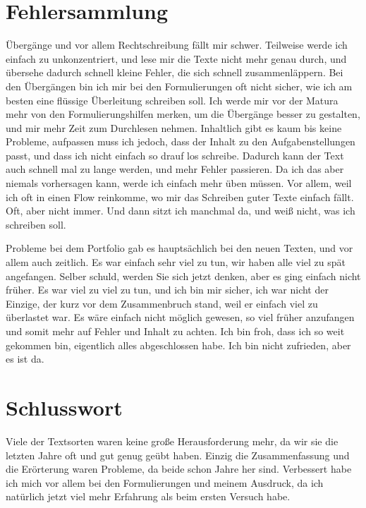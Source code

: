 \section{Fehlersammlung}

Übergänge und vor allem Rechtschreibung fällt mir schwer. Teilweise werde ich einfach zu unkonzentriert, und lese mir die Texte nicht mehr genau durch, und übersehe dadurch schnell kleine Fehler, die sich schnell zusammenläppern. Bei den Übergängen bin ich mir bei den Formulierungen oft nicht sicher, wie ich am besten eine flüssige Überleitung schreiben soll. Ich werde mir vor der Matura mehr von den Formulierungshilfen merken, um die Übergänge besser zu gestalten, und mir mehr Zeit zum Durchlesen nehmen. Inhaltlich gibt es kaum bis keine Probleme, aufpassen muss ich jedoch, dass der Inhalt zu den Aufgabenstellungen passt, und dass ich nicht einfach so drauf los schreibe. Dadurch kann der Text auch schnell mal zu lange werden, und mehr Fehler passieren. Da ich das aber niemals vorhersagen kann, werde ich einfach mehr üben müssen. Vor allem, weil ich oft in einen Flow reinkomme, wo mir das Schreiben guter Texte einfach fällt. Oft, aber nicht immer. Und dann sitzt ich manchmal da, und weiß nicht, was ich schreiben soll. 

Probleme bei dem Portfolio gab es hauptsächlich bei den neuen Texten, und vor allem auch zeitlich. Es war einfach sehr viel zu tun, wir haben alle viel zu spät angefangen. Selber schuld, werden Sie sich jetzt denken, aber es ging einfach nicht früher. Es war viel zu viel zu tun, und ich bin mir sicher, ich war nicht der Einzige, der kurz vor dem Zusammenbruch stand, weil er einfach viel zu überlastet war. Es wäre einfach nicht möglich gewesen, so viel früher anzufangen und somit mehr auf Fehler und Inhalt zu achten. Ich bin froh, dass ich so weit gekommen bin, eigentlich alles abgeschlossen habe. Ich bin nicht zufrieden, aber es ist da.  

\section{Schlusswort}
Viele der Textsorten waren keine große Herausforderung mehr, da wir sie die letzten Jahre oft und gut genug geübt haben. Einzig die Zusammenfassung und die Erörterung waren Probleme, da beide schon Jahre her sind. Verbessert habe ich mich vor allem bei den Formulierungen und meinem Ausdruck, da ich natürlich jetzt viel mehr Erfahrung als beim ersten Versuch habe.  


